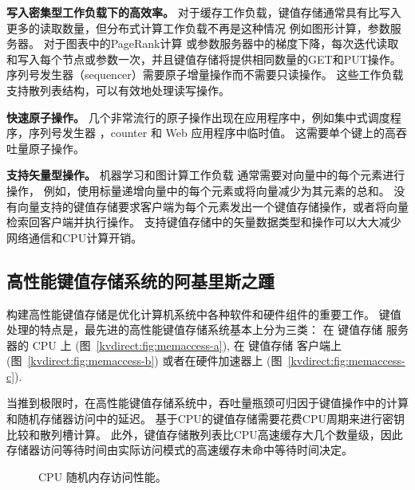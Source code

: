 \textbf {写入密集型工作负载下的高效率。}
对于缓存工作负载，键值存储通常具有比写入更多的读取数量\cite {atikoglu2012workload}，但分布式计算工作负载不再是这种情况
例如图形计算\cite {page1999pagerank}，参数服务器\cite {li2014scaling}。
对于图表中的PageRank计算\cite {page1999pagerank} 或参数服务器中的梯度下降\cite {li2014scaling}，每次迭代读取和写入每个节点或参数一次，并且键值存储将提供相同数量的GET和PUT操作。
序列号发生器（sequencer）\cite {kalia2016design}需要原子增量操作而不需要只读操作。
这些工作负载支持散列表结构，可以有效地处理读写操作。

\textbf {快速原子操作。}
几个非常流行的原子操作出现在应用程序中，例如集中式调度程序\cite {perry2014fastpass}，序列号发生器 \cite {kalia2016design,eris}，counter \cite {zhu2015packet}和 Web 应用程序中临时值\cite {atikoglu2012workload}。
这需要单个键上的高吞吐量原子操作。

\textbf {支持矢量型操作。}
机器学习和图计算工作负载\cite {li2014scaling,shao2013trinity,xiao17tux2} 通常需要对向量中的每个元素进行操作，
例如，使用标量递增向量中的每个元素或将向量减少为其元素的总和。
没有向量支持的键值存储要求客户端为每个元素发出一个键值存储操作，或者将向量检索回客户端并执行操作。
支持键值存储中的矢量数据类型和操作可以大大减少网络通信和CPU计算开销。

\subsection{高性能键值存储系统的阿基里斯之踵}
\label{kvdirect:sec:state-of-the-art-kvs}

构建高性能键值存储是优化计算机系统中各种软件和硬件组件的重要工作。
键值处理的特点是，最先进的高性能键值存储系统基本上分为三类：
在 键值存储 服务器的 CPU 上
(图~\ref{kvdirect:fig:memaccess-a}),
在 键值存储 客户端上
(图~\ref{kvdirect:fig:memaccess-b})
或者在硬件加速器上
(图~\ref{kvdirect:fig:memaccess-c}).

当推到极限时，在高性能键值存储系统中，吞吐量瓶颈可归因于键值操作中的计算和随机存储器访问中的延迟。
基于CPU的键值存储需要花费CPU周期来进行密钥比较和散列槽计算。
此外，键值存储散列表比CPU高速缓存大几个数量级，因此存储器访问等待时间由实际访问模式的高速缓存未命中等待时间决定。

\begin{figure}[t]
	\centering
	\caption{CPU 随机内存访问性能。}
	\label{kvdirect:fig:cpu-mem}
\end{figure}

